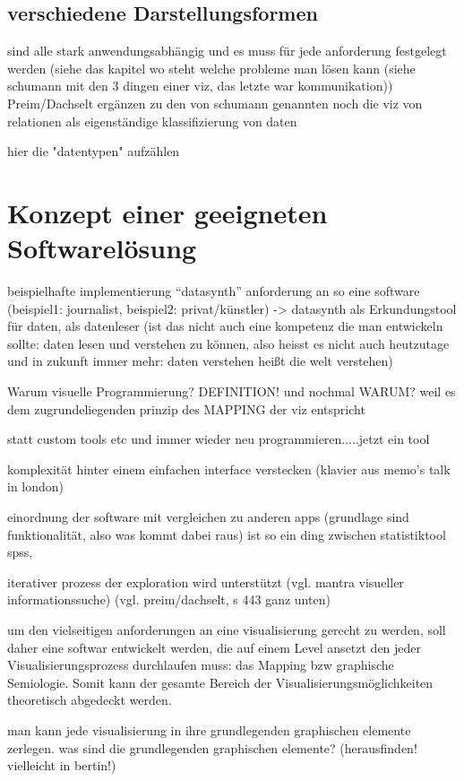 \documentclass[a4paper, 12pt, onepage, pdftex, headsepline, footsepline]{scrreprt}
\begin{document}
\subsection{verschiedene Darstellungsformen}
sind alle stark anwendungsabhängig und es muss für jede anforderung festgelegt werden (siehe das kapitel wo steht welche probleme man lösen kann (siehe schumann mit den 3 dingen einer viz, das letzte war kommunikation))
Preim/Dachselt ergänzen zu den von schumann genannten noch die viz von relationen als eigenständige klassifizierung von daten

hier die "datentypen" aufzählen

\section{Konzept einer geeigneten Softwarelösung}
beispielhafte implementierung “datasynth”
anforderung an so eine software (beispiel1: journalist, beispiel2: privat/künstler)
-> datasynth als Erkundungstool für daten, als datenleser (ist das nicht auch eine kompetenz die man entwickeln sollte: daten lesen und verstehen zu können, also heisst es nicht auch heutzutage und in zukunft immer mehr: daten verstehen heißt die welt verstehen)

Warum visuelle Programmierung? DEFINITION! und nochmal WARUM?
weil es dem zugrundeliegenden prinzip des MAPPING der viz entspricht

statt custom tools etc und immer wieder neu programmieren.....jetzt ein tool

komplexität hinter einem einfachen interface verstecken (klavier aus memo’s talk in london)

einordnung der software mit vergleichen zu anderen apps (grundlage sind funktionalität, also was kommt dabei raus) ist so ein ding zwischen statistiktool spss, 

iterativer prozess der exploration wird unterstützt (vgl. mantra visueller informationssuche) (vgl. preim/dachselt, s 443 ganz unten)

um den vielseitigen anforderungen an eine visualisierung gerecht zu werden, soll daher eine softwar entwickelt werden, die auf einem Level ansetzt den jeder Visualisierungsprozess durchlaufen muss: das Mapping bzw graphische Semiologie. Somit kann der gesamte Bereich der Visualisierungsmöglichkeiten theoretisch abgedeckt werden.

man kann jede visualisierung in ihre grundlegenden graphischen elemente zerlegen.
was sind die grundlegenden graphischen elemente? (herausfinden! vielleicht in bertin!)
\end{document}
